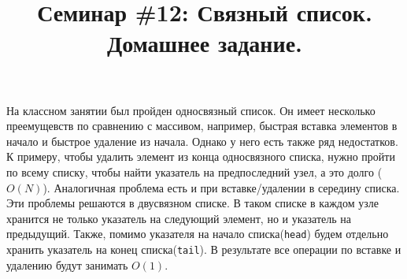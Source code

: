 \documentclass{article}
\begin{document}



\title{Семинар \#12: Связный список. Домашнее задание.\vspace{-5ex}}\date{}\maketitle
На классном занятии был пройден односвязный список. Он имеет несколько преемущевств по сравнению с массивом, например, быстрая вставка элементов в начало и быстрое удаление из начала. Однако у него есть также ряд недостатков. К примеру, чтобы удалить элемент из конца односвязного списка, нужно пройти по всему списку, чтобы найти указатель на предпоследний узел, а это долго ($O(N)$). Аналогичная проблема есть и при вставке/удалении в середину списка. Эти проблемы решаются в двусвязном списке. В таком списке в каждом узле хранится не только указатель на следующий элемент, но и указатель на предыдущий. Также, помимо указателя на начало списка(\texttt{head}) будем отдельно хранить указатель на конец списка(\texttt{tail}). В результате все операции по вставке и удалению будут занимать $O(1)$.\\
\end{document}

